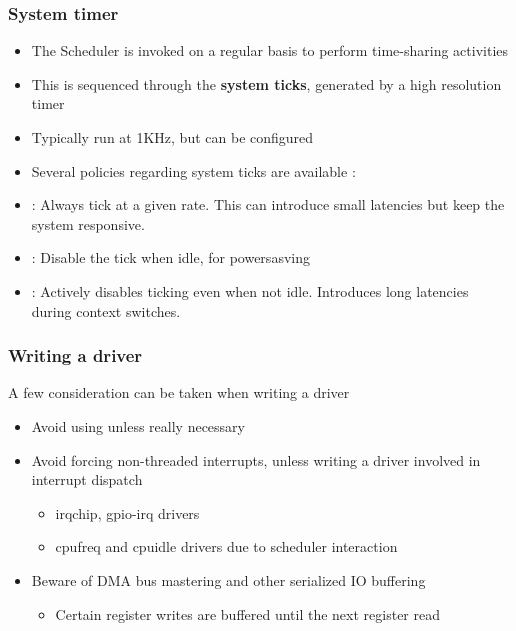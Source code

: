 \begin{frame}
	\frametitle{System timer}
	\begin{itemize}
		\item The Scheduler is invoked on a regular basis to perform time-sharing activities
		\item This is sequenced through the \textbf{system ticks}, generated by a high resolution timer
		\item Typically run at 1KHz, but can be configured
		\item Several policies regarding system ticks are available :
		\item {} : Always tick at a given rate. This can introduce small latencies but keep the system responsive.
		\item {} : Disable the tick when idle, for powersasving
		\item {} : Actively disables ticking even when not idle. Introduces long latencies during context switches.
	\end{itemize}
\end{frame}


\begin{frame}
		\frametitle{Writing a driver}
A few consideration can be taken when writing a driver
		\begin{itemize}
			\item Avoid using  unless really necessary
			\item Avoid forcing non-threaded interrupts, unless writing a driver involved in interrupt dispatch
				\begin{itemize}
					\item irqchip, gpio-irq drivers
					\item cpufreq and cpuidle drivers due to scheduler interaction
				\end{itemize}
			\item Beware of DMA bus mastering and other serialized IO buffering
				\begin{itemize}
					\item Certain register writes are buffered until the next register read
				\end{itemize}
		\end{itemize}
\end{frame}
